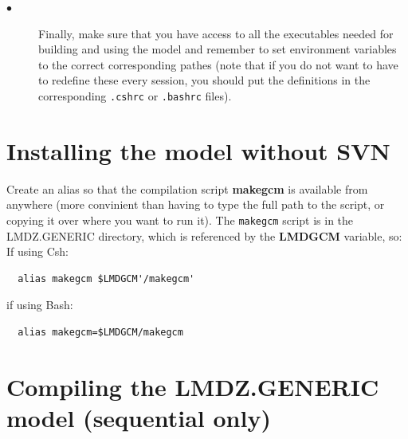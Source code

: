 \begin{description}
\item[$\bullet$] Finally, make sure that you have access to all the executables
needed for building and using the model and
remember to set environment variables to the correct corresponding pathes
(note that if you do not want to have to redefine these every session,
you should put the definitions in the corresponding {\tt .cshrc} or
{\tt .bashrc} files).


\end{description}


\section{Installing the model without SVN}

 Create an alias so that the compilation script {\bf makegcm}
  is available from anywhere (more convinient than having to type the full
  path to the script, or copying it over where you want to run it).
  The {\tt makegcm} script is in the LMDZ.GENERIC directory, which
  is referenced by the {\bf LMDGCM} variable, so:\\
  If using Csh:
  \begin{verbatim}
  alias makegcm $LMDGCM'/makegcm'
  \end{verbatim}
  if using Bash:
  \begin{verbatim}
  alias makegcm=$LMDGCM/makegcm
  \end{verbatim}

\section{Compiling the LMDZ.GENERIC model (sequential only)}
\label{sc:run1}

